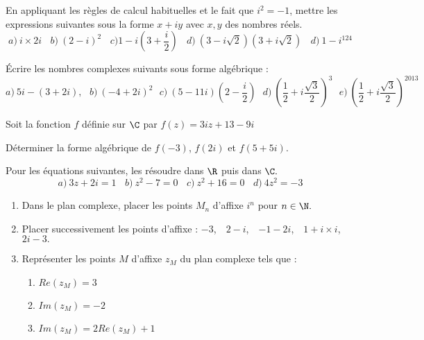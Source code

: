 \documentclass[a4paper,12pt]{article}
\renewcommand{\monlien}[2]{}
\renewcommand{\macible}[1]{}
\begin{document}
\begin{frame}
\macible{exoensembleC}{}

\EXO
En appliquant les r\`egles de calcul habituelles et le fait que $i^2=-1$, mettre les expressions suivantes sous la forme $x+iy$ avec $x,y$ des nombres r\'eels.
$$a)\ i\times 2i \ \ \ \ b)\ (2-i)^2\ \ \ \ c) 1-i\left(3+\frac{i}{2}\right)\ \ \ \ d)\ (3-i\sqrt{2})(3+i\sqrt{2})\ \ \ \ d)\ 1-i^{124} $$


\EXO
\'Ecrire les nombres complexes suivants sous forme alg\'ebrique :
$$a)\ 5i-(3+2i), \ \  \ b)\ (-4+2i)^2\ \ \ c)\ (5-11i)\left(2-\frac{i}{2}\right)\ \ \ 
d)\ \left(\frac{1}{2}+i\frac{\sqrt{3}}{2}\right)^3\ \ \ 
e)\ \left(\frac{1}{2}+i\frac{\sqrt{3}}{2}\right)^{2013}$$


\monlien{ensembleC}{\monbouton{Retour Cours}}


\EXO

Soit la fonction $f$ d\'efinie sur $\C$ par $f(z)=3iz+13-9i$


 D\'eterminer la forme alg\'ebrique de $f(-3)$, $f(2i)$ et $f(5+5i)$.


\monlien{ensembleC}{\monbouton{Retour Cours}}

\end{frame}

\vspace{.5cm}

\EXO

Pour les \'equations suivantes, les r\'esoudre dans $\R$ puis dans $\C.$
$$ a)\ 3z+2i=1\ \ \ \ b)\ z^2-7=0\ \ \ \ c)\ z^2+16=0\ \ \ \ d)\ 4z^2=-3$$


\macible{exopoints}
\macible{exovocabulaire}{}

\EXO %

\begin{enumerate}
\item Dans le plan complexe, placer  les points $M_n$ d'affixe $i^n$ pour $n\in \N.$
\item Placer successivement les points d'affixe : $-3$,\ \ $2-i$,\ \ $-1-2i$,\ \ $1+i\times i$,\ \ $2i-3.$
\item Repr\'esenter les points $M$ d'affixe $z_M$ du plan complexe tels que :
\begin{enumerate}
\item $Re(z_M)=3$
\item $Im(z_M)=-2$
\item $Im(z_M)=2Re(z_M)+1$
\end{enumerate} 
\end{enumerate}
\end{document}
